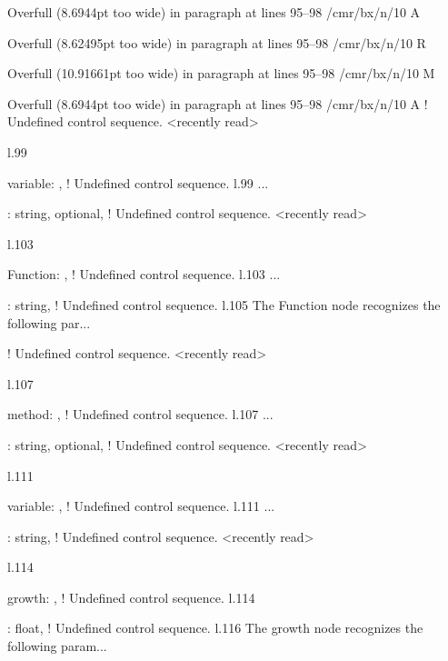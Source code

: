 {{{Overfull \hbox (8.6944pt too wide) in paragraph at lines 95--98
/cmr/bx/n/10 A

Overfull \hbox (8.62495pt too wide) in paragraph at lines 95--98
/cmr/bx/n/10 R

Overfull \hbox (10.91661pt too wide) in paragraph at lines 95--98
/cmr/bx/n/10 M

Overfull \hbox (8.6944pt too wide) in paragraph at lines 95--98
/cmr/bx/n/10 A
! Undefined control sequence.
<recently read> \xmlAttr 
                         
l.99                   \item \xmlAttr
                                     {variable}: ,
! Undefined control sequence.
l.99 ...        \item {}: \xmlDesc
                                                  {string, optional},
! Undefined control sequence.
<recently read> \xmlNode 
                         
l.103             \item \xmlNode
                                {Function}: ,
! Undefined control sequence.
l.103 ...       \item {}: \xmlDesc
                                                  {string},
! Undefined control sequence.
l.105               The \xmlNode
                                {Function} node recognizes the following par...

! Undefined control sequence.
<recently read> \xmlAttr 
                         
l.107                   \item \xmlAttr
                                      {method}: ,
! Undefined control sequence.
l.107 ...         \item {}: \xmlDesc
                                                  {string, optional},
! Undefined control sequence.
<recently read> \xmlNode 
                         
l.111             \item \xmlNode
                                {variable}: ,
! Undefined control sequence.
l.111 ...       \item {}: \xmlDesc
                                                  {string},
! Undefined control sequence.
<recently read> \xmlNode 
                         
l.114             \item \xmlNode
                                {growth}: ,
! Undefined control sequence.
l.114             \item {}: \xmlDesc
                                                  {float},
! Undefined control sequence.
l.116               The \xmlNode
                                {growth} node recognizes the following param...

}}}
